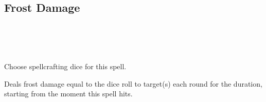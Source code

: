 \subsection*{Frost Damage}
 \\
\\
\\

Choose spellcrafting dice for this spell.

Deals frost damage equal to the dice roll to target(s) each round for
the duration, starting from the moment this spell hits.
